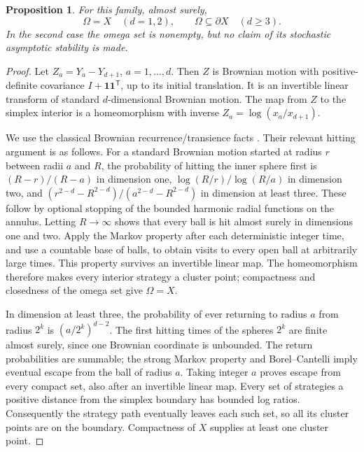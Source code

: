 \documentclass[11pt]{article}
\newtheorem{proposition}[theorem]{Proposition}
\theoremstyle{definition}
\begin{document}
\begin{proposition}
For this family, almost surely,
\[
 \Omega=X\quad(d=1,2),\qquad
 \Omega\subseteq\partial X\quad(d\ge3).                 \tag{2}
\]
In the second case the omega set is nonempty, but no claim of its
stochastic asymptotic stability is made.
\end{proposition}
\begin{proof}
Let $Z_a=Y_a-Y_{d+1}$, $a=1,\ldots,d$. Then $Z$ is Brownian motion
with positive-definite covariance $I+\mathbf1\mathbf1^{\mathsf T}$,
up to its initial translation. It is an invertible linear transform
of standard $d$-dimensional Brownian motion. The map from $Z$ to the
simplex interior is a homeomorphism with inverse
$Z_a=\log(x_a/x_{d+1})$.

We use the classical Brownian recurrence/transience facts
\cite[Section 3.2]{mp}. Their relevant hitting argument is as follows.
For a standard Brownian motion started at radius $r$ between radii
$a$ and $R$, the probability of hitting the inner sphere first is
$(R-r)/(R-a)$ in dimension one, $\log(R/r)/\log(R/a)$ in dimension
two, and $(r^{2-d}-R^{2-d})/(a^{2-d}-R^{2-d})$ in dimension at least
three. These follow by optional stopping of the bounded harmonic
radial functions on the annulus. Letting $R\to\infty$ shows that
every ball is hit almost surely in dimensions one and two. Apply
the Markov property after each deterministic integer time, and use
a countable base of balls, to obtain visits to every open ball at
arbitrarily large times. This property survives an invertible linear
map. The homeomorphism therefore makes every interior strategy a
cluster point; compactness and closedness of the omega set give
$\Omega=X$.

In dimension at least three, the probability of ever returning to
radius $a$ from radius $2^k$ is $(a/2^k)^{d-2}$. The first hitting
times of the spheres $2^k$ are finite almost surely, since one
Brownian coordinate is unbounded. The return probabilities are summable;
the strong Markov property and Borel--Cantelli imply eventual escape
from the ball of radius $a$. Taking integer $a$ proves escape from
every compact set, also after an invertible linear map. Every set of
strategies a positive distance from the simplex boundary has bounded
log ratios. Consequently the strategy path eventually leaves each
such set, so all its cluster points are on the boundary. Compactness
of $X$ supplies at least one cluster point.
\end{proof}
\end{document}
